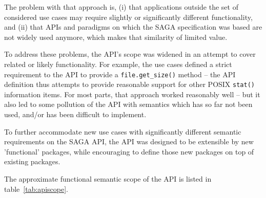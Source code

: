\documentclass[a4paper,12pt]{article}
\newcommand{\T}[1]{\texttt{#1}}
\begin{document}
  The problem with that approach is, (i) that applications outside the
  set of considered use cases may require slightly or significantly
  different functionality, and (ii) that APIs and paradigms on which
  the SAGA specification was based are not widely used anymore, which
  makes that similarity of limited value.

  To address these problems, the API's scope was widened in an attempt
  to cover related or likely functionality.  For example, the use
  cases defined a strict requirement to the API to provide a
  \T{file.get\_size()} method -- the API definition thus attempts to
  provide reasonable support for other POSIX \T{stat()} information
  items.  For most parts, that approach worked reasonably well -- but
  it also led to some pollution of the API with semantics which has so
  far not been used, and/or has been difficult to implement.

  To further accommodate new use cases with significantly different
  semantic requirements on the SAGA API, the API was designed to be
  extensible by new 'functional' packages, while encouraging to define
  those new packages on top of existing packages.

  The approximate functional semantic scope of the API is listed in
  table~\ref{tab:apiscope}.
\end{document}
